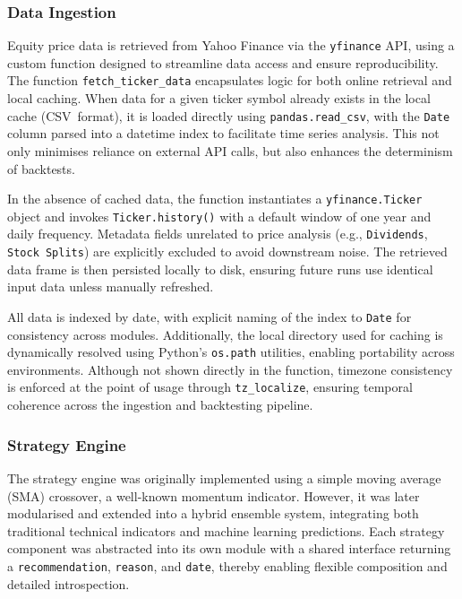\subsubsection{Data Ingestion}
Equity price data is retrieved from Yahoo Finance via the \texttt{yfinance} API, using a custom function designed to streamline data access and ensure reproducibility. The function \texttt{fetch\_ticker\_data} encapsulates logic for both online retrieval and local caching. When data for a given ticker symbol already exists in the local cache (CSV\ format), it is loaded directly using \texttt{pandas.read\_csv\(\)}, with the \texttt{Date} column parsed into a datetime index to facilitate time series analysis. This not only minimises reliance on external API calls, but also enhances the determinism of backtests.

In the absence of cached data, the function instantiates a \texttt{yfinance.Ticker} object and invokes \texttt{Ticker.history()} with a default window of one year and daily frequency. Metadata fields unrelated to price analysis (e.g., \texttt{Dividends}, \texttt{Stock Splits}) are explicitly excluded to avoid downstream noise. The retrieved data frame is then persisted locally to disk, ensuring future runs use identical input data unless manually refreshed.

All data is indexed by date, with explicit naming of the index to \texttt{Date} for consistency across modules. Additionally, the local directory used for caching is dynamically resolved using Python’s \texttt{os.path} utilities, enabling portability across environments. Although not shown directly in the function, timezone consistency is enforced at the point of usage through \texttt{tz\_localize}, ensuring temporal coherence across the ingestion and backtesting pipeline.

\subsubsection{Strategy Engine}

The strategy engine was originally implemented using a simple moving average (SMA) crossover, a well-known momentum indicator. However, it was later modularised and extended into a hybrid ensemble system, integrating both traditional technical indicators and machine learning predictions. Each strategy component was abstracted into its own module with a shared interface returning a \texttt{recommendation}, \texttt{reason}, and \texttt{date}, thereby enabling flexible composition and detailed introspection.

